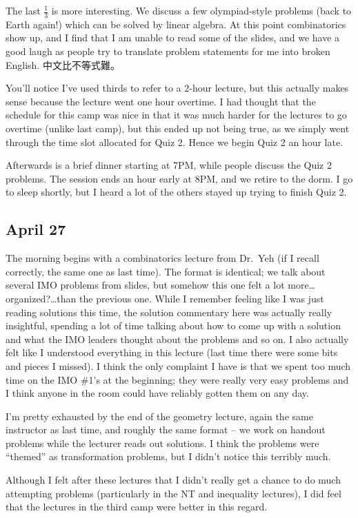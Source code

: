 \documentclass[11pt]{scrreprt}
\begin{document}
The last $\frac 13$ is more interesting.
We discuss a few olympiad-style problems (back to Earth again!) which can be solved by linear algebra.
At this point combinatorics show up, and I find that I am unable to read some of the slides,
and we have a good laugh as people try to translate problem statements for me into broken English. 中文比不等式難。

You'll notice I've used thirds to refer to a $2$-hour lecture,
but this actually makes sense because the lecture went one hour overtime.
I had thought that the schedule for this camp was nice in that it was much
harder for the lectures to go overtime (unlike last camp), but this ended up not being true,
as we simply went through the time slot allocated for Quiz 2. Hence we begin Quiz 2 an hour late.

Afterwards is a brief dinner starting at 7PM, while people discuss the Quiz 2 problems.
The session ends an hour early at 8PM, and we retire to the dorm.
I go to sleep shortly, but I heard a lot of the others stayed up trying to finish Quiz 2.

\subsection{April 27}
The morning begins with a combinatorics lecture from Dr.\ Yeh (if I recall correctly,
the same one as last time). The format is identical; we talk about several IMO problems from slides,
but somehow this one felt a lot more\dots organized?\dots than the previous one.
While I remember feeling like I was just reading solutions this time,
the solution commentary here was actually really insightful,
spending a lot of time talking about how to come up with a solution and what the
IMO leaders thought about the problems and so on.
I also actually felt like I understood everything in this lecture (last time
there were some bits and pieces I missed).
I think the only complaint I have is that we spent too much time on the IMO \#1's at the beginning;
they were really very easy problems and I think anyone in the room could have reliably gotten them on any day.

I'm pretty exhausted by the end of the geometry lecture, again the same instructor as last time,
and roughly the same format -- we work on handout problems while the lecturer reads out solutions.
I think the problems were ``themed'' as transformation problems, but I didn't notice this terribly much.

Although I felt after these lectures that I didn't really get a chance to do
much attempting problems (particularly in the NT and inequality lectures),
I did feel that the lectures in the third camp were better in this regard.
\end{document}

